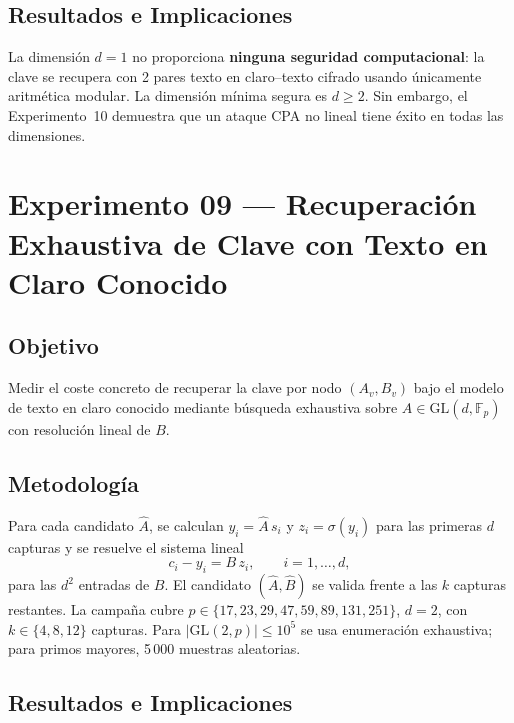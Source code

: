 \documentclass[12pt,a4paper]{article}
\theoremstyle{definition}
\newcommand{\Fp}{\mathbb{F}_p}
\newcommand{\GL}{\mathrm{GL}}
\begin{document}
\subsection{Resultados e Implicaciones}

La dimensión $d = 1$ no proporciona \textbf{ninguna seguridad
computacional}: la clave se recupera con 2 pares
texto en claro--texto cifrado usando únicamente aritmética modular.
La dimensión mínima segura es $d \geq 2$.
Sin embargo, el Experimento~10 demuestra que un ataque CPA no lineal
tiene éxito en todas las dimensiones.

\section{Experimento 09 --- Recuperación Exhaustiva de Clave con Texto en Claro Conocido}

\subsection{Objetivo}

Medir el coste concreto de recuperar la clave por nodo $(A_v, B_v)$
bajo el modelo de texto en claro conocido mediante búsqueda exhaustiva
sobre $A \in \GL(d, \Fp)$ con resolución lineal de $B$.

\subsection{Metodología}

Para cada candidato $\hat{A}$, se calculan $y_i = \hat{A}\, s_i$ y
$z_i = \sigma(y_i)$ para las primeras $d$ capturas y se resuelve el
sistema lineal
\begin{equation}
  c_i - y_i = B\, z_i, \qquad i = 1, \ldots, d,
\end{equation}
para las $d^2$ entradas de $B$. El candidato $(\hat{A}, \hat{B})$
se valida frente a las $k$ capturas restantes. La campaña cubre
$p \in \{17, 23, 29, 47, 59, 89, 131, 251\}$, $d = 2$, con
$k \in \{4, 8, 12\}$ capturas. Para $|\GL(2, p)| \leq 10^5$ se usa
enumeración exhaustiva; para primos mayores, 5\,000 muestras
aleatorias.

\subsection{Resultados e Implicaciones}
\end{document}
